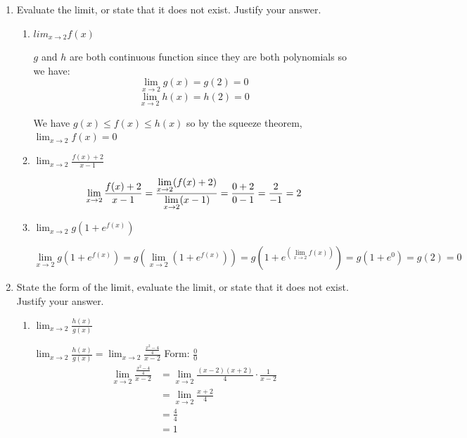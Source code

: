 \documentclass[nooutcomes]{ximera}
\begin{document}
\begin{problem}
\begin{enumerate}
	\item	Evaluate the limit, or state that it does not exist.  Justify your answer.
		\begin{enumerate}
		\item $lim_{x \to 2} f(x)$
			\begin{freeResponse}
		$g$ and $h$ are both continuous function since they are both polynomials so we have:
		\[
		\lim_{x \to 2} g(x)=g(2)=0
		\]
		\[
		\lim_{x \to 2} h(x)=h(2)=0
		\]

		We have $g(x) \le f(x) \le h(x)$ so by the squeeze theorem, $\lim_{x \to 2} f(x)=0$
			\end{freeResponse}

		\item $\lim_{x \to 2} \frac{f(x)+2}{x-1}$
			\begin{freeResponse}
			\[
			\lim_{x \to 2}\frac{f(x)+2}{x-1}=\frac{\lim_{x \to 2}(f(x)+2)}{\lim_{x \to 2}(x-1)}\\
			= \frac{0+2}{0-1}\\
			= \frac{2}{-1}\\
			= 2
			\]
			\end{freeResponse}
		\item $\lim_{x \to 2} g(1+e^{f(x)})$
			\begin{freeResponse}
			\[
			\lim_{x \to 2} g(1+e^{f(x)})= g (\lim_{x \to 2} (1+e^{f(x)}))
			=g (1+e^{(\lim_{x \to 2}f(x))})
			=g(1+e^0)=g(2)=0
			\]
			\end{freeResponse}

		\end{enumerate}
	\item State the form of the limit, evaluate the limit, or state that it does not exist.  Justify your answer.
		\begin{enumerate}
		
		
		\item $\lim_{x \to 2}\frac{h(x)}{g(x)}$

		\begin{freeResponse}
			$\lim_{x \to 2}\frac{h(x)}{g(x)}=\lim_{x \to 2}\frac{\frac{x^2-4}{4}}{x-2}$
		Form: $\frac{{0}}{0}$ \\
		\begin{align*}
		\lim_{x \to 2}\frac{\frac{x^2-4}{4}}{x-2}&=\lim_{x \to 2}\frac{(x-2)(x+2)}{4}\cdot \frac{1}{x-2}\\
		&= \lim_{x \to 2} \frac{x+2}{4}\\
		&= \frac{4}{4}\\
		&= 1
		\end{align*}
		\end{freeResponse}	


\end{enumerate}
\end{enumerate}
\end{problem}
\end{document}
